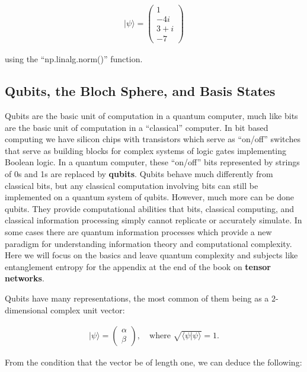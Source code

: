 \documentclass[11pt]{article}
\begin{document}
\begin{align}
|\psi \rangle = \begin{pmatrix}
1 \\ -4i \\ 3+i \\ -7
\end{pmatrix}
\end{align}

using the ``np.linalg.norm()'' function.

    \hypertarget{qubits-the-bloch-sphere-and-basis-states}{%
\subsection{Qubits, the Bloch Sphere, and Basis
States}\label{qubits-the-bloch-sphere-and-basis-states}}

    Qubits are the basic unit of computation in a quantum computer, much
like bits are the basic unit of computation in a ``classical'' computer.
In bit based computing we have silicon chips with transistors which
serve as ``on/off'' switches that serve as building blocks for complex
systems of logic gates implementing Boolean logic. In a quantum
computer, these ``on/off'' bits represented by strings of 0s and 1s are
replaced by \textbf{qubits}. Qubits behave much differently from
classical bits, but any classical computation involving bits can still
be implemented on a quantum system of qubits. However, much more can be
done qubits. They provide computational abilities that bits, classical
computing, and classical information processing simply cannot replicate
or accurately simulate. In some cases there are quantum information
processes which provide a new paradigm for understanding information
theory and computational complexity. Here we will focus on the basics
and leave quantum complexity and subjects like entanglement entropy for
the appendix at the end of the book on \textbf{tensor networks}.

Qubits have many representations, the most common of them being as a
\(2\)-dimensional complex unit vector:

\begin{align}
|\psi \rangle = \begin{pmatrix}
\alpha \\ \beta
\end{pmatrix}, \quad \text{where } \sqrt{\langle \psi | \psi \rangle} = 1. 
\end{align}

From the condition that the vector be of length one, we can deduce the
following:
\end{document}
